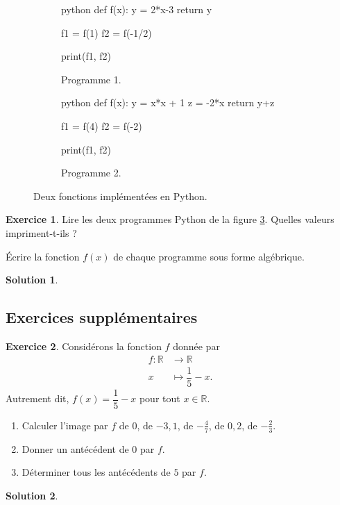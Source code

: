 \documentclass[a4paper, 14pt]{extarticle}
\theoremstyle{plain}
\newtheorem*{sol}{Solution}
\theoremstyle{definition}
\newtheorem{ex}{Exercice}
\newcommand{\R}{\mathbb{R}}
\newcommand{\exe}[2]{
		\begin{ex} #1  \end{ex}
		\begin{sol} #2 \end{sol}
	}
\newcommand{\exe}[2]{
		\begin{ex} #1  \end{ex}
	}
\begin{document}
		
	\begin{figure}[!htb]
		\begin{subfigure}[b]{.45\textwidth}
\begin{mintedbox}{python}
def f(x):
	y = 2*x-3
	return y

f1 = f(1)
f2 = f(-1/2)


print(f1, f2)
\end{mintedbox}
		\caption{Programme 1.}
		\label{python:1}
		\end{subfigure}
		\begin{subfigure}[b]{.45\textwidth}
\begin{mintedbox}{python}
def f(x):
	y = x*x + 1
	z = -2*x
	return y+z

f1 = f(4)
f2 = f(-2)

print(f1, f2)
\end{mintedbox}
		\caption{Programme 2.}
		\label{python:2}
		\end{subfigure}
		\caption{Deux fonctions implémentées en Python.}
		\label{python:1-2}
	\end{figure}
	
	\exe{
		Lire les deux programmes Python de la figure \ref{python:1-2}.
		Quelles valeurs impriment-t-ils ?
		
		Écrire la fonction $f(x)$ de chaque programme sous forme algébrique.
	}{}

\newpage
\subsection*{Exercices supplémentaires}

	\exe{
		Considérons la fonction $f$ donnée par
		\begin{align*}
			f: \R & \longrightarrow \R \\
			x& \longmapsto \dfrac15-x.
		\end{align*}
		Autrement dit, $f(x) = \dfrac15-x$ pour tout $x\in\R$.
		
		\begin{enumerate}
			\item
			Calculer l'image par $f$ de $0$, de $-3,1$, de $-\frac47$, de $0,2$, de $-\frac23$.
			\item
			Donner un antécédent de $0$ par $f$.
			\item
			Déterminer tous les antécédents de $5$ par $f$.	
		\end{enumerate}
	}{}
	
\end{document}
